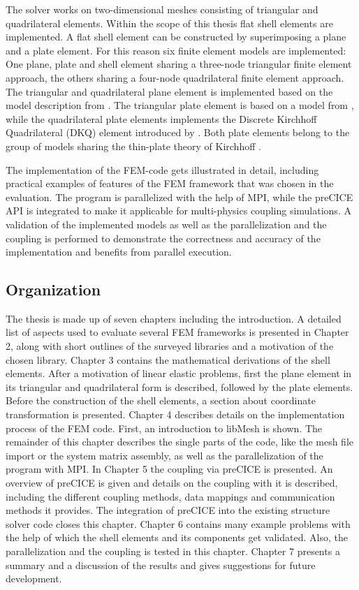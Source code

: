 The solver works on two-dimensional meshes consisting of triangular and quadrilateral elements. Within the scope of this thesis flat shell elements are implemented. A flat shell element can be constructed by superimposing a plane and a plate element. For this reason six finite element models are implemented: One plane, plate and shell element sharing a three-node triangular finite element approach, the others sharing a four-node quadrilateral finite element approach. The triangular and quadrilateral plane element is implemented based on the model description from \cite{steinke2005finite}. The triangular plate element is based on a model from \cite{specht1988modified}, while the quadrilateral plate elements implements the Discrete Kirchhoff Quadrilateral (DKQ) element introduced by \cite{zienkiewicz2000finite}. Both plate elements belong to the group of models sharing the thin-plate theory of Kirchhoff \cite{steinke2005finite}.

The implementation of the FEM-code gets illustrated in detail, including practical examples of features of the FEM framework that was chosen in the evaluation. The program is parallelized with the help of MPI, while the preCICE API is integrated to make it applicable for multi-physics coupling simulations. A validation of the implemented models as well as the parallelization and the coupling is performed to demonstrate the correctness and accuracy of the implementation and benefits from parallel execution.

\subsection{Organization}
The thesis is made up of seven chapters including the introduction. A detailed list of aspects used to evaluate several FEM frameworks is presented in Chapter 2, along with short outlines of the surveyed libraries and a motivation of the chosen library. Chapter 3 contains the mathematical derivations of the shell elements. After a motivation of linear elastic problems, first the plane element in its triangular and quadrilateral form is described, followed by the plate elements. Before the construction of the shell elements, a section about coordinate transformation is presented. Chapter 4 describes details on the implementation process of the FEM code. First, an introduction to libMesh is shown. The remainder of this chapter describes the single parts of the code, like the mesh file import or the system matrix assembly, as well as the parallelization of the program with MPI. In Chapter 5 the coupling via preCICE is presented. An overview of preCICE is given and details on the coupling with it is described, including the different coupling methods, data mappings and communication methods it provides. The integration of preCICE into the existing structure solver code closes this chapter. Chapter 6 contains many example problems with the help of which the shell elements and its components get validated. Also, the parallelization and the coupling is tested in this chapter. Chapter 7 presents a summary and a discussion of the results and gives suggestions for future development.